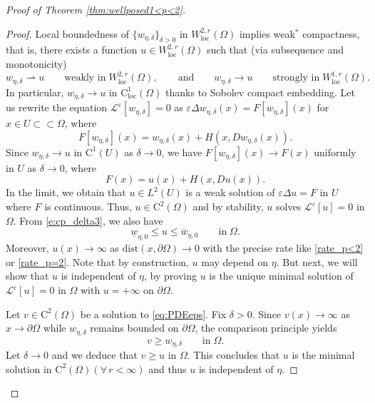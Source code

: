 \documentclass[12pt,reqno]{amsart}
\numberwithin{figure}{section}
\theoremstyle{plain}
\theoremstyle{remark}
\numberwithin{equation}{section}
\newcommand{\rmC}{\mathrm{C}}
\newcommand{\rup}{\rightharpoonup}
\begin{document}
\begin{proof} [Proof of Theorem \ref{thm:wellposed1<p<2}]
\begin{proof}
    \noindent Local boundedness of $\{w_{\eta,\delta}\}_{\delta>0}$ in $W^{2,r}_{\mathrm{loc}}(\Omega)$ implies weak$^*$ compactness, that is, there exists a function $u\in W^{2,r}_{\mathrm{loc}}(\Omega)$ such that (via subsequence and monotonicity)
    \begin{equation*}
        w_{\eta,\delta} \rup u \qquad\text{weakly in}\;W^{2,r}_{\mathrm{loc}}(\Omega),\qquad \text{and}\qquad
        w_{\eta,\delta} \to u \qquad\text{strongly in}\;W^{1,r}_{\mathrm{loc}}(\Omega).
    \end{equation*}
    In particular, $w_{\eta,\delta}\to u$ in $\mathrm{C}^1_{\mathrm{loc}}(\Omega)$ thanks to Sobolev compact embedding. Let us rewrite the equation $\mathcal{L}^\varepsilon\left[w_{\eta,\delta}\right] = 0$ as $\varepsilon\Delta w_{\eta,\delta}(x) = F[w_{\eta,\delta}](x)$ for $x \in U\subset\subset \Omega$, where
    \begin{equation*}
        F[w_{\eta,\delta}](x) =    w_{\eta,\delta}(x) + H(x,Dw_{\eta,\delta}(x)).
    \end{equation*}
    Since $w_{\eta,\delta}\to u$ in $\mathrm{C}^1(U)$ as $\delta \to 0$, we have $F[w_{\eta,\delta}](x) \to F(x)$ uniformly in $U$ as $\delta \to 0$,  where 
    \begin{equation*}
        F(x) =   u(x) + H(x,Du(x)).
    \end{equation*}
    In the limit, we obtain that $u\in L^2(U)$ is a weak solution of $\varepsilon\Delta u = F$ in $U$ where $F$ is continuous. Thus, $u\in \mathrm{C}^2(\Omega)$ and by stability, $u$ solves $\mathcal{L}^\varepsilon[u] = 0$ in $\Omega$. From \eqref{e:cp_delta3}, we also have
    \begin{equation*}
        \underline{w}_{\eta,0} \leq u \leq \overline{w}_{\eta,0} \qquad\text{in}\;\Omega.
    \end{equation*}
    Moreover, $u(x)\to \infty$ as $\mathrm{dist}(x,\partial\Omega)\to 0$ with the precise rate like \eqref{rate_p<2} or \eqref{rate_p=2}. Note that by construction, $u$ may depend on $\eta$. But next, we will show that $u$ is independent of $\eta$, by proving $u$ is the unique minimal solution of $\mathcal{L}^\varepsilon[u] = 0$ in $\Omega$ with $u = +\infty$ on $\partial\Omega$.
    
    \noindent Let $v\in \rmC^{2}(\Omega)$ be a solution to \eqref{eq:PDEeps}. Fix $\delta>0$. Since $v(x)\to \infty$ as $x\to \partial\Omega$ while $w_{\eta,\delta}$ remains bounded on $\partial \Omega$, the comparison principle yields
    \begin{equation*}
        v\geq w_{\eta,\delta} \qquad\text{in} \; \Omega.
    \end{equation*}
    Let $\delta\to 0$ and we deduce that $v\geq u$ in $\Omega$. This concludes that $u$ is the minimal solution in $\mathrm{C}^2(\Omega)(\forall\,r<\infty)$ and thus $u$ is independent of $\eta$. 
\end{proof}



\end{proof}
\end{document}
